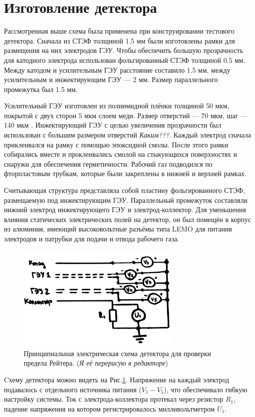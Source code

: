\section{Изготовление детектора}
Рассмотренная выше схема была применена при конструировании тестового детектора. Сначала из СТЭФ толщиной 1.5 мм были изготовлены рамки для размещения на них электродов ГЭУ. Чтобы обеспечить большую прозрачность для катодного электрода использован фольгированный СТЭФ толщиной 0.5 мм. Между катодом и усилительным ГЭУ расстояние составило 1.5 мм, между усилительным и инжектирующим ГЭУ --- 2 мм. Размер параллельного промежутка был 1.5 мм.
\par Усилительный ГЭУ изготовлен из полиимидной плёнки толщиной 50 мкм, покрытой с двух сторон 5 мкм слоем меди. Размер отверстий --- 70 мкм, шаг --- 140 мкм \cite{sauli}. Инжектирующий ГЭУ с целью увеличения прозрачности был использован с большим размером отверстий \textit{Каким???}. Каждый электрод сначала приклеивался на рамку с помощью эпоксидной смолы. После этого рамки собирались вместе и проклеивались смолой на стыкующихся поверхностях и снаружи для обеспечения герметичности. Рабочий газ подводился по фторпластовым трубкам, которые были закреплены в нижней и верхней рамках.
\par Считывающая структура представляла собой пластину фольгированного СТЭФ, размещаемую под инжектирующим ГЭУ. Параллельный промежуток составляли нижний электрод инжектирующего ГЭУ и электрод-коллектор. Для уменьшения влияния статических электрических полей на детектор, он был помещён в корпус из алюминия, имеющий высоковольтные разъёмы типа LEMO для питания электродов и патрубки для подачи и отвода рабочего газа.  
\begin{figure}[H]
	\begin{center}
		\includegraphics[width = 8cm]{img/Scheme_raether_det.pdf}
		\caption{Принципиальная электрическая схема детектора для проверки предела Рейтера. (\textit{Я её перерисую в редакторе})}
		\label{el_scheme_raether}
	\end{center}
\end{figure}
\noindent
\par Cхему детектора можно видеть на Рис.\ref{el_scheme_raether}. Напряжение на каждый электрод подавалось с отдельного источника питания ($V_1-V_5$), что обеспечивало гибкую настройку системы.
Ток с электрода-коллектора протекал через резистор $R_1$, падение напряжения на котором регистрировалось милливольтметром $U_1$. 
